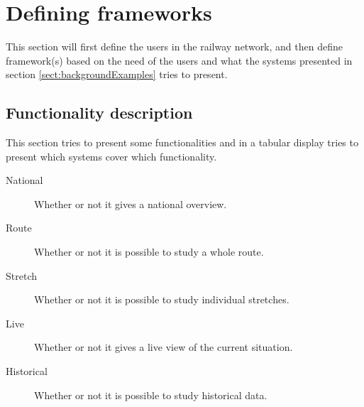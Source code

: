 
\section{Defining frameworks} %
\label{sec:defining_frameworks}
This section will first define the users in the railway network, and then
define framework(s) based on the need of the users and what the systems
presented in section \ref{sect:backgroundExamples} tries to present.

\clearpage
\subsection{Functionality description} %
\label{sub:functionality_description}
This section tries to present some functionalities and in a tabular display 
tries to present which systems cover which functionality. 
\begin{description}
	\item [National]	Whether or not it gives a national overview.
	\item [Route]		Whether or not it is possible to study a whole route.
	\item [Stretch]		Whether or not it is possible to study individual 						stretches.
	\item [Live]		Whether or not it gives a live view of the current 						situation.
	\item [Historical]	Whether or not it is possible to study historical data.
\end{description}

